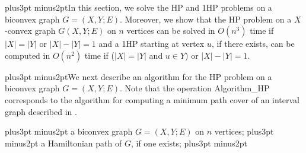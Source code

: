 \documentclass[10pt]{article}
\def\yskip{\penalty-50\vskip3pt plus3pt minus2pt}
\def\y{\yskip}
\begin{document}
{\y In this section, we solve the HP and 1HP problems on a biconvex
graph $G=(X,Y;E)$. Moreover, we show that the HP problem on a
$X$-convex graph $G(X,Y;E)$ on $n$ vertices can be solved in
$O(n^3)$ time if $|X|=|Y|$ or $|X|-|Y|=1$ and a 1HP starting at
vertex $u$, if there exists, can be computed in $O(n^2)$ time if
($|X|=|Y|$ and $u \in Y$) or $|X|-|Y|=1$.

\y  We next describe an algorithm for the HP problem on a biconvex
graph $G=(X,Y;E)$. Note that the operation Algorithm\_HP
corresponds to the algorithm for computing a minimum path cover of
an interval graph described in \cite{AR90}.


\bigskip {} \y {} a biconvex graph $G=(X,Y;E)$ on $n$ vertices; \y
{} a Hamiltonian path of $G$, if one exists;
\y

}
\end{document}
